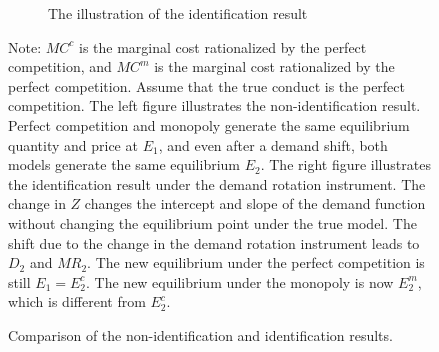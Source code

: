 \documentclass[11pt, a4paper]{article}
\theoremstyle{remark}
\begin{document}
\begin{figure}[th!]
\begin{center}
\begin{subfigure}[t]{0.45\textwidth}
        \caption{The illustration of the identification result}
        \label{fig:bresnahan_identification}
    \end{subfigure}
    \end{center}
    \caption{Comparison of the non-identification and identification results.}
    \label{fig:bresnahan_results}
    \vspace{2mm}
    \footnotesize
    Note: $MC^c$ is the marginal cost rationalized by the perfect competition, and $MC^m$ is the marginal cost rationalized by the perfect competition. 
    Assume that the true conduct is the perfect competition.
    The left figure illustrates the non-identification result. Perfect competition and monopoly generate the same equilibrium quantity and price at $E_1$, and even after a demand shift, both models generate the same equilibrium $E_2$.
    The right figure illustrates the identification result under the demand rotation instrument.
    The change in $Z$ changes the intercept and slope of the demand function without changing the equilibrium point under the true model.
    The shift due to the change in the demand rotation instrument leads to $D_2$ and $MR_2$.
    The new equilibrium under the perfect competition is still $E_1 = E_2^c$.
    The new equilibrium under the monopoly is now $E_2^m$, which is different from $E_2^c$.
\end{figure}
\end{document}
